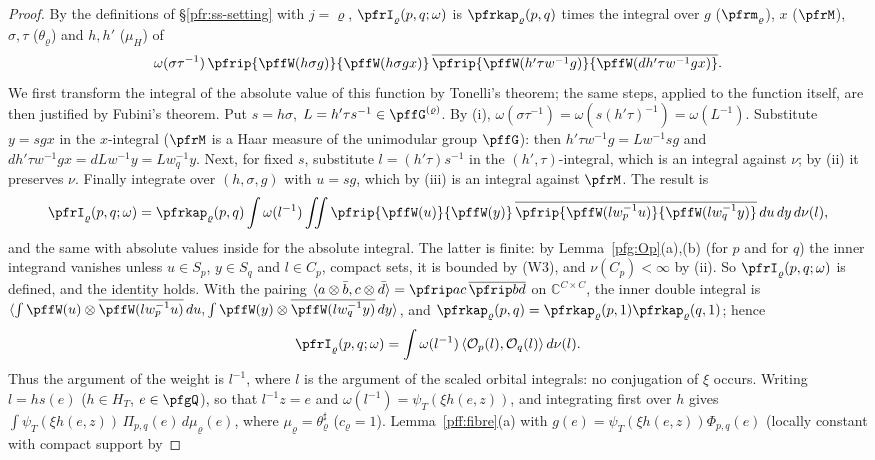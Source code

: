 \documentclass[10pt]{amsart}
\theoremstyle{definition}
\theoremstyle{remark}
\newcommand{\C}{\mathbb C}
\begin{document}
\begin{proof}
By the definitions of \S\ref{pfr:ss-setting} with $j=\varrho$, $\pfrI_\varrho(p,q;\omega)$ is $\pfrkap_\varrho(p,q)$ times the integral over
$g$ ($\pfrm_\varrho$), $x$ ($\pfrM$), $\sigma,\tau$ ($\theta_\varrho$) and $h,h'$ ($\mu_H$) of
\[
\omega(\sigma\tau^{-1})\,\pfrip{\pffW(h\sigma g)}{\pffW(h\sigma gx)}\,\overline{\pfrip{\pffW(h'\tau w^{-1}g)}{\pffW(dh'\tau w^{-1}gx)}}.
\]
We first transform the integral of the absolute value of this function by Tonelli's theorem; the same steps, applied to the
function itself, are then justified by Fubini's theorem. Put $s=h\sigma$, $L=h'\tau s^{-1}\in\pffG^{(\varrho)}$. By (i),
$\omega(\sigma\tau^{-1})=\omega(s(h'\tau)^{-1})=\omega(L^{-1})$. Substitute $y=sgx$ in the $x$-integral ($\pfrM$ is a Haar measure of
the unimodular group $\pffG$): then $h'\tau w^{-1}g=Lw^{-1}sg$ and $dh'\tau w^{-1}gx=dLw^{-1}y=Lw_q^{-1}y$. Next, for fixed $s$,
substitute $l=(h'\tau)s^{-1}$ in the $(h',\tau)$-integral, which is an integral against $\nu$; by (ii) it preserves $\nu$. Finally
integrate over $(h,\sigma,g)$ with $u=sg$, which by (iii) is an integral against $\pfrM$. The result is
\[
\pfrI_\varrho(p,q;\omega)=\pfrkap_\varrho(p,q)\int\omega(l^{-1})\iint\pfrip{\pffW(u)}{\pffW(y)}\,
\overline{\pfrip{\pffW(lw_p^{-1}u)}{\pffW(lw_q^{-1}y)}}\,du\,dy\,d\nu(l),
\]
and the same with absolute values inside for the absolute integral. The latter is finite: by Lemma~\ref{pfg:Op}(a),(b) (for $p$
and for $q$) the inner integrand vanishes unless $u\in S_p$, $y\in S_q$ and $l\in C_p$, compact sets, it is bounded by (W3),
and $\nu(C_p)<\infty$ by (ii). So $\pfrI_\varrho(p,q;\omega)$ is defined, and the identity holds. With the pairing
$\langle a\otimes\bar b,c\otimes\bar d\rangle=\pfrip ac\,\overline{\pfrip bd}$ on $\C^{C\times C}$, the inner double integral is
$\langle\int\pffW(u)\otimes\overline{\pffW(lw_p^{-1}u)}\,du,\int\pffW(y)\otimes\overline{\pffW(lw_q^{-1}y)}\,dy\rangle$, and
$\pfrkap_\varrho(p,q)=\pfrkap_\varrho(p,1)\pfrkap_\varrho(q,1)$; hence
\[
\pfrI_\varrho(p,q;\omega)=\int\omega(l^{-1})\,\langle\mathcal O_p(l),\mathcal O_q(l)\rangle\,d\nu(l).
\]
Thus the argument of the weight is $l^{-1}$, where $l$ is the argument of the scaled orbital integrals: no conjugation of $\xi$
occurs. Writing $l=hs(e)$ ($h\in H_T$, $e\in\pfgQ$), so that $l^{-1}z=e$ and $\omega(l^{-1})=\psi_T(\xi h(e,z))$, and integrating
first over $h$ gives $\int\psi_T(\xi h(e,z))\,\Pi_{p,q}(e)\,d\mu_\varrho(e)$, where $\mu_\varrho=\theta_\varrho^\sharp$ ($c_\varrho=1$).
Lemma~\ref{pff:fibre}(a) with $g(e)=\psi_T(\xi h(e,z))\Phi_{p,q}(e)$ (locally constant with compact support by

\end{proof}
\end{document}
